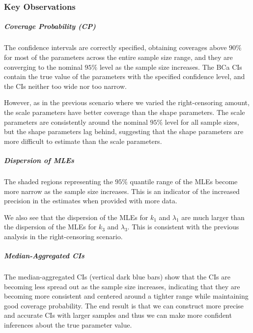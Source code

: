 \documentclass[
]{article}
\theoremstyle{definition}
\theoremstyle{plain}
\theoremstyle{definition}
\theoremstyle{definition}
\theoremstyle{definition}
\theoremstyle{definition}
\theoremstyle{remark}
\begin{document}
\hypertarget{key-observations-2}{%
\subsubsection{Key Observations}\label{key-observations-2}}

\hypertarget{coverage-probability-cp-2}{%
\subparagraph*{Coverage Probability (CP)}\label{coverage-probability-cp-2}}

The confidence intervals are correctly specified, obtaining coverages
above \(90\%\) for most of the parameters across the entire sample size range,
and they are converging to the nominal \(95\%\) level as the sample size
increases. The BCa CIs contain the true value of the parameters with the
specified confidence level, and the CIs neither too wide nor too narrow.

However, as in the previous scenario where we varied the right-censoring
amount, the scale parameters have better coverage than the shape parameters.
The scale parameters are consistently around the nominal \(95\%\) level for all
sample sizes, but the shape parameters lag behind, suggesting that the shape
parameters are more difficult to estimate than the scale parameters.

\hypertarget{dispersion-of-mles-2}{%
\subparagraph*{Dispersion of MLEs}\label{dispersion-of-mles-2}}

The shaded regions representing the \(95\%\) quantile range of the MLEs become
more narrow as the sample size increases. This is an indicator of the increased
precision in the estimates when provided with more data.

We also see that the dispersion of the MLEs for \(k_1\) and \(\lambda_1\) are much
larger than the dispersion of the MLEs for \(k_3\) and \(\lambda_3\). This is
consistent with the previous analysis in the right-censoring scenario.

\hypertarget{median-aggregated-cis-2}{%
\subparagraph*{Median-Aggregated CIs}\label{median-aggregated-cis-2}}

The median-aggregated CIs (vertical dark blue bars) show that the CIs are
becoming less spread out as the sample size increases, indicating that they are
becoming more consistent and centered around a tighter range while maintaining
good coverage probability. The end result is that we can construct more precise
and accurate CIs with larger samples and thus we can make more confident
inferences about the true parameter value.
\end{document}
